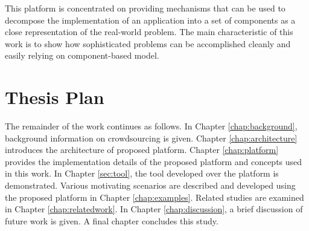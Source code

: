 This platform is concentrated on providing mechanisms that can be used to decompose 
the implementation of an application into a set of components as a close representation 
of the real-world problem. The main characteristic of this work is to show how 
sophisticated problems can be accomplished cleanly and easily relying on 
component-based model.


\section{Thesis Plan}

The remainder of the work continues as follows. In Chapter \ref{chap:background}, 
background information on crowdsourcing is given. Chapter \ref{chap:architecture} 
introduces the architecture of proposed platform. Chapter \ref{chap:platform} provides 
the implementation details of the proposed platform and concepts used in this work. 
In Chapter \ref{sec:tool}, the tool developed over the platform is demonstrated. 
Various motivating scenarios are described and developed using the proposed 
platform in Chapter \ref{chap:examples}. Related studies are examined in Chapter 
\ref{chap:relatedwork}. In Chapter \ref{chap:discussion}, a brief discussion of future work 
is given. A final chapter concludes this study.
